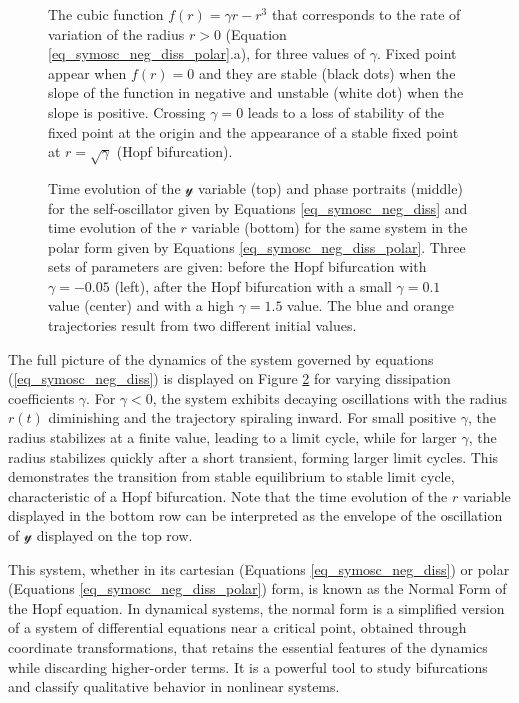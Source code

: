 \documentclass{article}
\begin{document}
\begin{figure} [h]
    \centerline{}
    \caption{The cubic function $f(r)=\gamma r - r^3$ that corresponds to the rate of variation of the radius $r>0$ (Equation \ref{eq_symosc_neg_diss_polar}.a), for three values of $\gamma$. Fixed point appear when $f(r)=0$ and they are stable (black dots) when the slope of the function in negative and unstable (white dot) when the slope is positive. Crossing $\gamma=0$ leads to a loss of stability of the fixed point at the origin and the appearance of a stable fixed point at $r=\sqrt{\gamma}$ (Hopf bifurcation). } 
    \label{fig_cubic}
\end{figure}






\begin{figure} [h]
    \centerline{}
    \caption{Time evolution of the $\mathscr{y}$ variable (top) and phase portraits (middle) for the self-oscillator given by Equations \ref{eq_symosc_neg_diss} and time evolution of the $r$ variable (bottom) for the same system in the polar form given by Equations \ref{eq_symosc_neg_diss_polar}. 
    Three sets of parameters are given: before the Hopf bifurcation with $\gamma = -0.05$ (left), after the Hopf bifurcation with a small $\gamma = 0.1$ value (center) and with a high $\gamma = 1.5$ value.
    The blue and orange trajectories result from two different initial values.}
    \label{fig_symself}
\end{figure}

The full picture of the dynamics of the system governed by equations (\ref{eq_symosc_neg_diss}) is displayed on Figure \ref{fig_symself} for varying dissipation coefficients $\gamma$. 
For $\gamma < 0$, the system exhibits decaying oscillations with the radius $r(t)$ diminishing and the trajectory spiraling inward. For small positive $\gamma$, the radius stabilizes at a finite value, leading to a limit cycle, while for larger $\gamma$, the radius stabilizes quickly after a short transient, forming larger limit cycles. This demonstrates the transition from stable equilibrium to stable limit cycle, characteristic of a Hopf bifurcation. 
Note that the time evolution of the $r$ variable displayed in the bottom row can be interpreted as the envelope of the oscillation of $\mathscr{y}$ displayed on the top row. 

This system, whether in its cartesian (Equations {\ref{eq_symosc_neg_diss}}) or polar (Equations \ref{eq_symosc_neg_diss_polar}) form, is known as the Normal Form of the Hopf equation. 
In dynamical systems, the normal form is a simplified version of a system of differential equations near a critical point, obtained through coordinate transformations, that retains the essential features of the dynamics while discarding higher-order terms. 
It is a powerful tool to study bifurcations and classify qualitative behavior in nonlinear systems.
\end{document}
